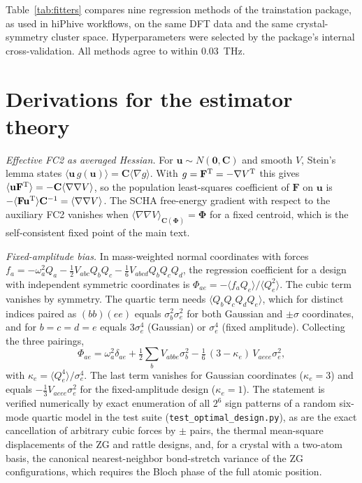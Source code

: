 \documentclass[aip,jap,reprint,amsmath,amssymb,floatfix]{revtex4-2}
\begin{document}
Table~\ref{tab:fitters} compares nine regression methods of the trainstation
package, as used in hiPhive workflows, on the same DFT data and the same
crystal-symmetry cluster space. Hyperparameters were selected by the
package's internal cross-validation. All methods agree to within 0.03~THz.



\section{Derivations for the estimator theory}

\textit{Effective FC2 as averaged Hessian.} For $\mathbf u\sim
N(\mathbf 0,\mathbf C)$ and smooth $V$, Stein's lemma states
$\langle\mathbf u\,g(\mathbf u)\rangle=\mathbf C\langle\nabla g\rangle$.
With $g=\mathbf F^{\rm T}=-\nabla V^{\rm T}$ this gives
$\langle\mathbf u\mathbf F^{\rm T}\rangle=-\mathbf C\langle\nabla\nabla V\rangle$,
so the population least-squares coefficient of $\mathbf F$ on $\mathbf u$ is
$-\langle\mathbf F\mathbf u^{\rm T}\rangle\mathbf C^{-1}=\langle\nabla\nabla V\rangle$.
The SCHA free-energy gradient with respect to the auxiliary FC2 vanishes
when $\langle\nabla\nabla V\rangle_{\mathbf C(\boldsymbol\Phi)}=\boldsymbol\Phi$
for a fixed centroid, which is the self-consistent fixed point of the main
text.

\textit{Fixed-amplitude bias.} In mass-weighted normal coordinates with
forces $f_a=-\omega_a^2Q_a-\tfrac12V_{abc}Q_bQ_c-\tfrac16V_{abcd}Q_bQ_cQ_d$,
the regression coefficient for a design with independent symmetric
coordinates is $\Phi_{ae}=-\langle f_aQ_e\rangle/\langle Q_e^2\rangle$. The
cubic term vanishes by symmetry. The quartic term needs
$\langle Q_bQ_cQ_dQ_e\rangle$, which for distinct indices paired as
$(bb)(ee)$ equals $\sigma_b^2\sigma_e^2$ for both Gaussian and $\pm\sigma$
coordinates, and for $b=c=d=e$ equals $3\sigma_e^4$ (Gaussian) or
$\sigma_e^4$ (fixed amplitude). Collecting the three pairings,
\begin{equation}
\Phi_{ae}=\omega_a^2\delta_{ae}+\tfrac12\sum_{b}V_{abbe}\sigma_b^2
-\tfrac{1}{6}\,(3-\kappa_e)\,V_{aeee}\sigma_e^2,
\end{equation}
with $\kappa_e=\langle Q_e^4\rangle/\sigma_e^4$. The last term vanishes for
Gaussian coordinates ($\kappa_e=3$) and equals $-\tfrac13V_{aeee}\sigma_e^2$ for
the fixed-amplitude design ($\kappa_e=1$). The
statement is verified numerically by exact enumeration of all $2^6$ sign
patterns of a random six-mode quartic model in the test suite
(\texttt{test\_optimal\_design.py}), as are the exact cancellation of
arbitrary cubic forces by $\pm$ pairs, the thermal mean-square
displacements of the ZG and rattle designs, and, for a crystal with a
two-atom basis, the canonical nearest-neighbor bond-stretch variance of the
ZG configurations, which requires the Bloch phase of the full atomic
position.
\end{document}

